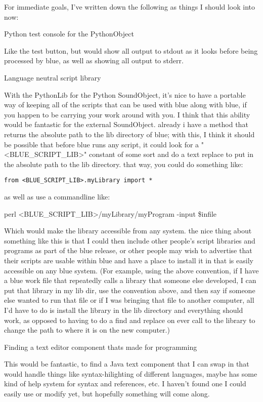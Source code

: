 For immediate goals, I've written down the following as things I should
look into now:

Python test console for the PythonObject

Like the test button, but would show all output to stdout as it looks
before being processed by blue, as well as showing all output to stderr.

Language neutral script library

With the PythonLib for the Python SoundObject, it's nice to have a
portable way of keeping all of the scripts that can be used with blue
along with blue, if you happen to be carrying your work around with you.
I think that this ability would be fantastic for the external
SoundObject. already i have a method that returns the absolute path to
the lib directory of blue; with this, I think it should be possible that
before blue runs any script, it could look for a
"\textless{}BLUE\_SCRIPT\_LIB\textgreater{}" constant of some sort and
do a text replace to put in the absolute path to the lib directory. that
way, you could do something like:

\begin{verbatim}
from <BLUE_SCRIPT_LIB>.myLibrary import *
\end{verbatim}

as well as use a commandline like:

perl \textless{}BLUE\_SCRIPT\_LIB\textgreater{}/myLibrary/myProgram
-input \$infile

Which would make the library accessible from any system. the nice thing
about something like this is that I could then include other people's
script libraries and programs as part of the blue release, or other
people may wish to advertise that their scripts are usable within blue
and have a place to install it in that is easily accessible on any blue
system. (For example, using the above convention, if I have a blue work
file that repeatedly calls a library that someone else developed, I can
put that library in my lib dir, use the convention above, and then say
if someone else wanted to run that file or if I was bringing that file
to another computer, all I'd have to do is install the library in the
lib directory and everything should work, as opposed to having to do a
find and replace on ever call to the library to change the path to where
it is on the new computer.)

Finding a text editor component thats made for programming

This would be fantastic, to find a Java text component that I can swap
in that would handle things like syntax-hilighting of different
languages, maybe has some kind of help system for syntax and references,
etc. I haven't found one I could easily use or modify yet, but hopefully
something will come along.


